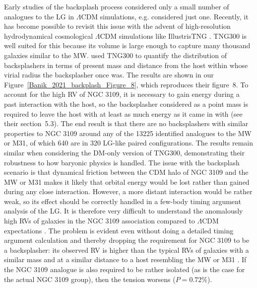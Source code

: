 \documentclass[fleqn,usenatbib,useAMS,onecolumn]{mnras} %
\begin{document}
Early studies of the backsplash process considered only a small number of analogues to the LG in $\Lambda$CDM simulations, e.g. \citet{Teyssier_2012} considered just one. Recently, it has become possible to revisit this issue with the advent of high-resolution hydrodynamical cosmological $\Lambda$CDM simulations like IllustrisTNG \citep{Nelson_2019}. TNG300 is well suited for this because its volume is large enough to capture many thousand galaxies similar to the MW. \citet{Banik_2021_backsplash} used TNG300 to quantify the distribution of backsplashers in terms of present mass and distance from the host within whose virial radius the backsplasher once was. The results are shown in our Figure~\ref{Banik_2021_backplash_Figure_8}, which reproduces their figure~8. To account for the high RV of NGC 3109, it is necessary to gain energy during a past interaction with the host, so the backsplasher considered as a point mass is required to leave the host with at least as much energy as it came in with (see their section~5.3). The end result is that there are no backsplashers with similar properties to NGC 3109 around any of the 13225 identified analogues to the MW or M31, of which 640 are in 320 LG-like paired configurations. The results remain similar when considering the DM-only version of TNG300, demonstrating their robustness to how baryonic physics is handled. The issue with the backsplash scenario is that dynamical friction between the CDM halo of NGC 3109 and the MW or M31 makes it likely that orbital energy would be lost rather than gained during any close interaction. However, a more distant interaction would be rather weak, so its effect should be correctly handled in a few-body timing argument analysis of the LG. It is therefore very difficult to understand the anomalously high RVs of galaxies in the NGC 3109 association compared to $\Lambda$CDM expectations \citep{Peebles_2017, Banik_Zhao_2017, Banik_2018_anisotropy}. The problem is evident even without doing a detailed timing argument calculation and thereby dropping the requirement for NGC 3109 to be a backsplasher: its observed RV is higher than the typical RVs of galaxies with a similar mass and at a similar distance to a host resembling the MW or M31 \citep[$P = 1.09\%$; see section~4.1 of][]{Banik_2021_backsplash}. If the NGC 3109 analogue is also required to be rather isolated (as is the case for the actual NGC 3109 group), then the tension worsens ($P = 0.72\%$).

\end{document}
